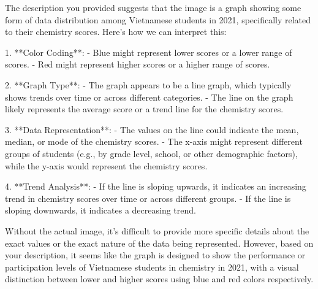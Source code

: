 The description you provided suggests that the image is a graph showing some form of data distribution among Vietnamese students in 2021, specifically related to their chemistry scores. Here's how we can interpret this:

1. **Color Coding**: 
   - Blue might represent lower scores or a lower range of scores.
   - Red might represent higher scores or a higher range of scores.

2. **Graph Type**:
   - The graph appears to be a line graph, which typically shows trends over time or across different categories.
   - The line on the graph likely represents the average score or a trend line for the chemistry scores.

3. **Data Representation**:
   - The values on the line could indicate the mean, median, or mode of the chemistry scores.
   - The x-axis might represent different groups of students (e.g., by grade level, school, or other demographic factors), while the y-axis would represent the chemistry scores.

4. **Trend Analysis**:
   - If the line is sloping upwards, it indicates an increasing trend in chemistry scores over time or across different groups.
   - If the line is sloping downwards, it indicates a decreasing trend.

Without the actual image, it's difficult to provide more specific details about the exact values or the exact nature of the data being represented. However, based on your description, it seems like the graph is designed to show the performance or participation levels of Vietnamese students in chemistry in 2021, with a visual distinction between lower and higher scores using blue and red colors respectively.